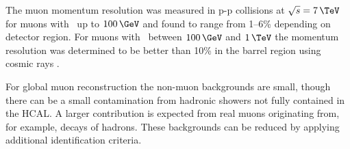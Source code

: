 The muon momentum resolution was measured in p-p collisions at $\sqrt{s}=7\,\TeV$ 
for muons with \pT~up to $100\,\GeV$ and found to range from 1--6\% depending
on detector region. For muons with \pT~between $100\,\GeV$ and $1\,\TeV$ the momentum resolution
was determined to be better than 10\% in the barrel region using cosmic rays \cite{cms-muon-reco}.

For global muon reconstruction the non-muon backgrounds are small,
though there can be a small contamination from hadronic showers not fully
contained in the \ac{HCAL}. A larger contribution is expected
from real muons originating from, for example, decays of hadrons. These
backgrounds can be reduced by applying additional identification criteria.

